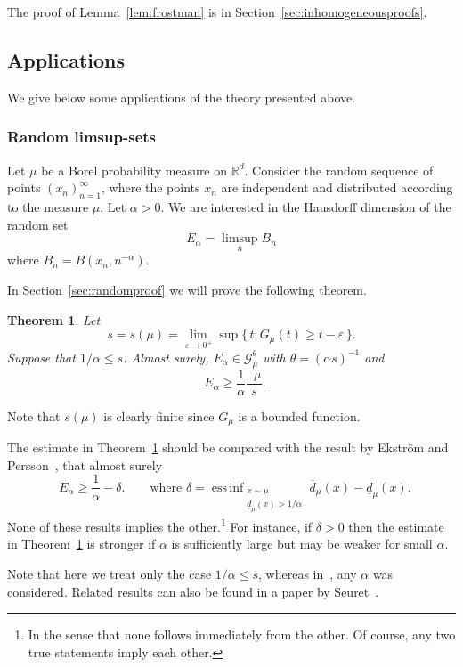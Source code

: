 \documentclass[11pt]{article}
\newtheorem{theo}{Theorem}[section]
\theoremstyle{definition}
\numberwithin{equation}{section}
\numberwithin{figure}{section}
\numberwithin{table}{section}
\DeclareMathOperator{\dimh}{dim_H}
\DeclareMathOperator{\udimh}{\overline{dim}_H}
\DeclareMathOperator*{\essinf}{ess\,inf}
\begin{document}
The proof of Lemma~\ref{lem:frostman} is in Section~\ref{sec:inhomogeneousproofs}.

\subsection{Applications} \label{sec:applications}

We give below some applications of the theory presented above.

\subsubsection{Random limsup-sets} \label{sec:random}

Let $\mu$ be a Borel probability measure on $\mathbb{R}^d$. Consider the random sequence of points $(x_n)_{n=1}^\infty$, where the points $x_n$ are independent and distributed according to the measure $\mu$. Let $\alpha > 0$. We are interested in the Hausdorff dimension of the random set
\[
E_\alpha = \limsup_n B_n
\]
where $B_n = B(x_n,n^{-\alpha})$.

In Section~\ref{sec:randomproof} we will prove the following theorem.

\begin{theo}\label{the:randomlimsup}
Let
\[
s = s (\mu) = \lim_{\varepsilon \to 0^+} \sup \{\, t : G_\mu (t)
\geq t - \varepsilon \,\}.
\]
Suppose that $1/\alpha \leq s$. Almost surely, $E_\alpha \in
\mathscr{G}_\mu^\theta$ with $\theta = (\alpha s)^{-1}$ and
\[
\dimh E_\alpha \geq \frac{1}{\alpha} \frac{\udimh \mu}{s}.
\]
\end{theo}

Note that $s (\mu)$ is clearly finite since $G_\mu$ is a bounded function.

The estimate in Theorem~\ref{the:randomlimsup} should be compared with the result by Ekstr\"om and Persson~\cite[Theorem~1]{ekstrompersson}, that almost surely
\[
\dimh E_\alpha \geq \frac{1}{\alpha} - \delta. \qquad \text{where }
\delta = \essinf_{\substack{x \sim \mu \\ \underline{d}_\mu (x) > 1 /
\alpha}} \overline{d}_\mu (x) - \underline{d}_\mu (x).
\]
None of these results implies the other.\footnote{In the sense that none follows immediately from the other. Of course, any two true statements imply each other.} For instance, if $\delta > 0$ then the estimate in Theorem~\ref{the:randomlimsup} is stronger if $\alpha$ is sufficiently large but may be weaker for small $\alpha$.

Note that here we treat only the case $1/\alpha \leq s$, whereas in~\cite{ekstrompersson}, any $\alpha$ was considered. Related results can also be found in a paper by Seuret~\cite{seuret}.
\end{document}
